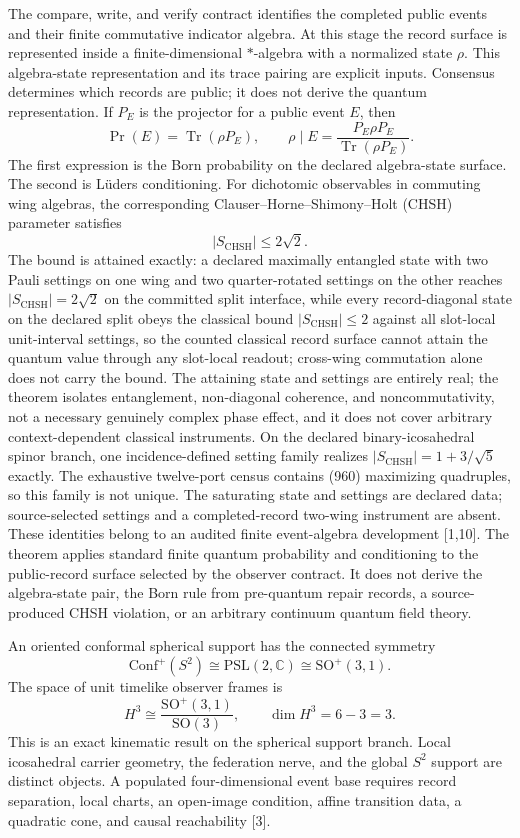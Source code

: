 \documentclass[10pt]{article}
\newcommand{\sect}[1]{\vspace{0.44em}{\large\bfseries\color{pragmaCyanText}#1}\par\vspace{0.02em}}
\begin{document}
The compare, write, and verify contract identifies the completed public
events and their finite commutative indicator algebra. At this stage the
record surface is represented inside a finite-dimensional \(*\)-algebra with
a normalized state \(\rho\). This algebra-state representation and its trace
pairing are explicit inputs. Consensus determines which records are public;
it does not derive the quantum representation. If \(P_E\) is the projector
for a public event \(E\), then
\[
  \Pr(E)=\operatorname{Tr}(\rho P_E),\qquad
  \rho\mid E=
  \frac{P_E\rho P_E}{\operatorname{Tr}(\rho P_E)}.
\]
The first expression is the Born probability on the declared algebra-state
surface. The second is L\"uders conditioning. For dichotomic observables in
commuting wing algebras, the corresponding
Clauser--Horne--Shimony--Holt (CHSH) parameter satisfies
\[
  |S_{\mathrm{CHSH}}|\leq 2\sqrt2 .
\]
The bound is attained exactly: a declared maximally entangled state with two
Pauli settings on one wing and two quarter-rotated settings on the other
reaches \(|S_{\mathrm{CHSH}}|=2\sqrt2\) on the committed split interface,
while every record-diagonal state on the declared split obeys the classical
bound \(|S_{\mathrm{CHSH}}|\leq 2\) against all slot-local unit-interval
settings, so the counted classical record surface cannot attain the quantum
value through any slot-local readout; cross-wing commutation alone does not
carry the bound. The attaining state and settings are
entirely real; the theorem isolates entanglement, non-diagonal coherence, and
noncommutativity, not a necessary genuinely complex phase effect, and it
does not cover arbitrary context-dependent classical instruments.
On the declared binary-icosahedral spinor branch, one incidence-defined
setting family realizes
\(\lvert S_{\mathrm{CHSH}}\rvert=1+3/\sqrt5\) exactly. The exhaustive
twelve-port census contains (960) maximizing quadruples, so this family is
not unique. The saturating state and settings are declared data;
source-selected settings and a completed-record two-wing
instrument are absent.
These identities belong to an audited finite event-algebra development
[1,10]. The theorem applies standard finite quantum probability
and conditioning to the public-record surface selected by the observer
contract. It does not derive the algebra-state pair, the Born rule from
pre-quantum repair records, a source-produced CHSH violation, or an
arbitrary continuum quantum field theory.

\sect{3. Lorentz kinematics and the Einstein branch}

An oriented conformal spherical support has the connected symmetry
\[
 \mathrm{Conf}^+(S^2)
 \cong \mathrm{PSL}(2,\mathbb C)
 \cong \mathrm{SO}^+(3,1).
\]
The space of unit timelike observer frames is
\[
 H^3\cong
 \frac{\mathrm{SO}^+(3,1)}{\mathrm{SO}(3)},\qquad
 \dim H^3=6-3=3.
\]
This is an exact kinematic result on the spherical support branch. Local
icosahedral carrier geometry, the federation nerve, and the global \(S^2\)
support are distinct objects. A populated four-dimensional event base
requires record separation, local charts, an open-image condition, affine
transition data, a quadratic cone, and causal reachability [3].
\end{document}
